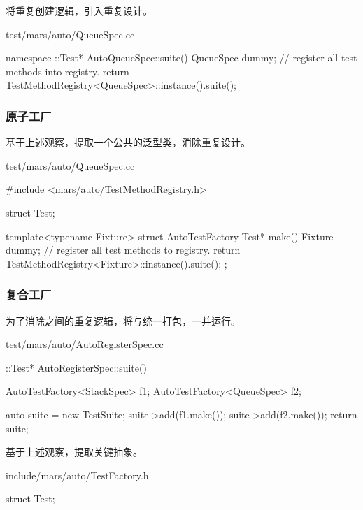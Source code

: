 \begin{content}
将重复创建逻辑，引入重复设计。

\begin{nodiff}{test/mars/auto/QueueSpec.cc}
 \begin{c++}
namespace {
  ::Test* AutoQueueSpec::suite() {
    QueueSpec dummy; // register all test methods into registry.
    return TestMethodRegistry<QueueSpec>::instance().suite();
  }
}
 \end{c++}
\end{nodiff}

\subsubsection{原子工厂}

基于上述观察，提取一个公共的泛型类，消除重复设计。

\begin{nodiff}{test/mars/auto/QueueSpec.cc}
 \begin{c++}
#include <mars/auto/TestMethodRegistry.h>

struct Test;

template<typename Fixture>
struct AutoTestFactory {
  Test* make() {
    Fixture dummy; // register all test methods to registry.
    return TestMethodRegistry<Fixture>::instance().suite();
  }
};
 \end{c++}
\end{nodiff}

\subsubsection{复合工厂}

为了消除之间的重复逻辑，将与统一打包，一并运行。

\begin{nodiff}{test/mars/auto/AutoRegisterSpec.cc}
 \begin{c++}
::Test* AutoRegisterSpec::suite() {
  AutoTestFactory<StackSpec> f1;
  AutoTestFactory<QueueSpec> f2;

  auto suite = new TestSuite;
  suite->add(f1.make());
  suite->add(f2.make());
  return suite;
}
 \end{c++}
\end{nodiff}

基于上述观察，提取关键抽象。

\begin{nodiff}{include/mars/auto/TestFactory.h}
 \begin{c++}
struct Test;


\end{c++}
\end{nodiff}
\end{content}
